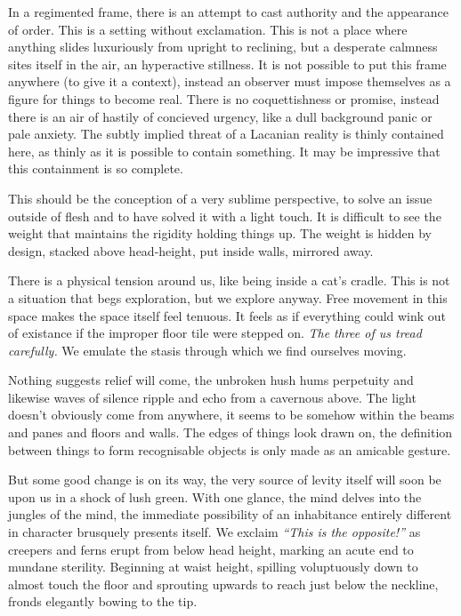 \documentclass{article}
\begin{document}
In a regimented frame, there is an attempt to cast authority and the appearance
of order. This is a setting without exclamation. This is not a place where
anything slides luxuriously from upright to reclining, but a desperate calmness
sites itself in the air, an hyperactive stillness. It is not possible to put
this frame anywhere (to give it a context), instead an observer must impose
themselves as a figure for things to become real. There is no coquettishness or
promise, instead there is an air of hastily of concieved urgency, like a dull
background panic or pale anxiety. The subtly implied threat of a Lacanian
reality is thinly contained here, as thinly as it is possible to contain
something. It may be impressive that this containment is so complete.

This should be the conception of a very sublime perspective, to solve an issue
outside of flesh and to have solved it with a light touch. It is difficult to
see the weight that maintains the rigidity holding things up. The weight is
hidden by design, stacked above head-height, put inside walls, mirrored away.

There is a physical tension around us, like being inside a cat's cradle. This
is not a situation that begs exploration, but we explore anyway. Free movement
in this space makes the space itself feel tenuous. It feels as if everything
could wink out of existance if the improper floor tile were stepped on.
\emph{The three of us tread carefully.} We emulate the stasis through which we
find ourselves moving.

Nothing suggests relief will come, the unbroken hush hums perpetuity and
likewise waves of silence ripple and echo from a cavernous above. The light
doesn't obviously come from anywhere, it seems to be somehow within the beams
and panes and floors and walls. The edges of things look drawn on, the
definition between things to form recognisable objects is only made as an
amicable gesture.

But some good change is on its way, the very source of levity itself will soon
be upon us in a shock of lush green. With one glance, the mind delves into the
jungles of the mind, the immediate possibility of an inhabitance entirely
different in character brusquely presents itself. We exclaim \emph{``This is
the opposite!''} as creepers and ferns erupt from below head height, marking an
acute end to mundane sterility. Beginning at waist height, spilling
voluptuously down to almost touch the floor and sprouting upwards to reach just
below the neckline, fronds elegantly bowing to the tip.
\end{document}
